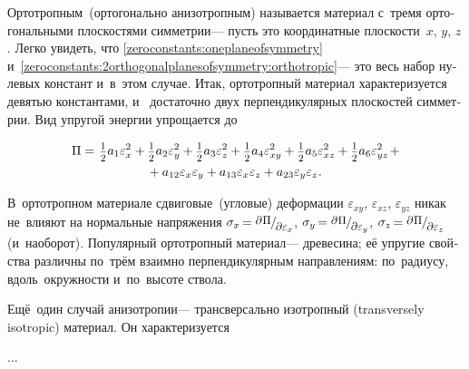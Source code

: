 \begin{otherlanguage}{russian}
Ортотропным~(ортогонально анизотропным) называется материал с~тремя ортогональными плоскостями симметрии\:--- пусть это координатные плоскости~$x$, $y$, $z$. Легко увидеть, что \eqref{zeroconstants:oneplaneofsymmetry} и~\eqref{zeroconstants:2orthogonalplanesofsymmetry:orthotropic}\:--- это весь набор нулевых констант и~в~этом случае. Итак, ортотропный материал характеризуется девятью константами, и~ достаточно двух перпендикулярных плоскостей симметрии. Вид упругой энергии упрощается до

\nopagebreak\vspace{-0.25em}\begin{multline*}
\Pi =^{\mathstrut^{\mathstrut}} \smalldisplaystyleonehalf a_1 \varepsilon^2_{x} + \smalldisplaystyleonehalf a_2 \varepsilon^2_{y} + \smalldisplaystyleonehalf a_3 \varepsilon^2_{z} + \smalldisplaystyleonehalf a_4 \varepsilon^2_{xy} + \smalldisplaystyleonehalf a_5 \varepsilon^2_{xz} + \smalldisplaystyleonehalf a_6 \varepsilon^2_{yz} \hspace{0.25ex} + \\[-0.1em]
%
+ \hspace{0.5ex} a_{12} \varepsilon_{x} \varepsilon_{y} + a_{13} \varepsilon_{x} \varepsilon_{z} + a_{23} \varepsilon_{y} \varepsilon_{z} \hspace{0.1ex} .
\end{multline*}

В~ортотропном материале сдвиговые~(угловые) деформации $\varepsilon_{xy}$, $\varepsilon_{xz}$, $\varepsilon_{yz}$ никак не~влияют на нормальные напряжения ${\sigma_x \hspace{-0.25ex} = \raisemath{0.16em}{\scalebox{0.88}{$\partial \hspace{0.1ex} \Pi$}} \hspace{-0.1ex} / \hspace{-0.2ex} \raisemath{-0.32em}{\scalebox{0.88}{$\partial \varepsilon_x$}}}$, ${\sigma_y \hspace{-0.25ex} = \raisemath{0.16em}{\scalebox{0.88}{$\partial \hspace{0.1ex} \Pi$}} \hspace{-0.1ex} / \hspace{-0.2ex} \raisemath{-0.32em}{\scalebox{0.88}{$\partial \varepsilon_y$}}}$, ${\sigma_z \hspace{-0.25ex} = \raisemath{0.16em}{\scalebox{0.88}{$\partial \hspace{0.1ex} \Pi$}} \hspace{-0.1ex} / \hspace{-0.2ex} \raisemath{-0.32em}{\scalebox{0.88}{$\partial \varepsilon_z$}}}$ (и~наоборот). Популярный ортотропный материал\:--- древесина; её упругие свойства различны по~трём взаимно перпендикулярным направлениям: по~радиусу, вдоль~окружности и~по~высоте ствола.

Ещё~один случай анизотропии\:--- трансверсально изотропный (transversely isotropic) материал. Он характеризуется

...



\end{otherlanguage}


